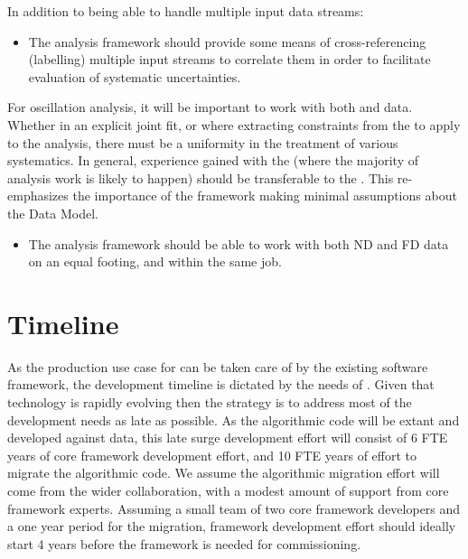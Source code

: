 \documentclass[../main-v1.tex]{subfiles}
\begin{document}
In addition to being able to handle multiple input data streams:

\begin{itemize}
\item The analysis framework should provide some means of cross-referencing (labelling) multiple input streams to correlate them in order to facilitate evaluation of systematic uncertainties.
\end{itemize}

For oscillation analysis, it will be important to work with both  and  data. Whether in an explicit joint fit, or where extracting constraints from the  to apply to the  analysis, there must be a uniformity in the treatment of various systematics. In general, experience gained with the  (where the majority of analysis work is likely to happen) should be transferable to the .  This re-emphasizes the importance of the framework making minimal assumptions about the Data Model.

\begin{itemize}
\item The analysis framework should be able to work with both ND and FD data on an equal footing, and within the same job.


\end{itemize}



\section{Timeline}

As the production use case for  can be taken care of by the existing software framework, the development timeline is dictated by the needs of .  Given that technology is rapidly evolving then the strategy is to address most of the development needs as late as possible. As the algorithmic code will be extant and developed against  data, this late surge development effort will consist of 6 FTE years of core framework development effort, and 10 FTE years of effort to migrate the algorithmic code.  We assume the algorithmic migration effort will come from the wider collaboration, with a modest amount of support from core framework experts.
Assuming a small team of two core framework developers
and a one year period for the migration, framework development effort should ideally start 4 years before the framework is needed for commissioning.
\end{document}
